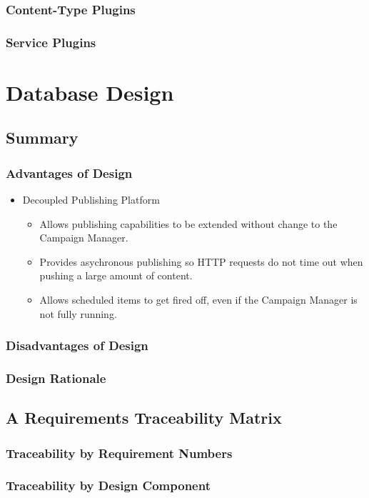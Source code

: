 \documentclass{report}
\begin{document}
		\subsection{Content-Type Plugins}
		\subsection{Service Plugins}

\chapter{Database Design}
\section{Summary}
\subsection{Advantages of Design}
\begin{itemize}
\item Decoupled Publishing Platform
  \begin{itemize}
  \item Allows publishing capabilities to be extended without change to the Campaign Manager.
  \item Provides asychronous publishing so HTTP requests do not time out when pushing a large amount of content.
  \item Allows scheduled items to get fired off, even if the Campaign Manager is not fully running.
  \end{itemize}
\end{itemize}
\subsection{Disadvantages of Design}
\subsection{Design Rationale}
\section{A Requirements Traceability Matrix}
\subsection{Traceability by Requirement Numbers}
\subsection{Traceability by Design Component}
\end{document}
